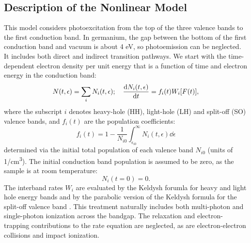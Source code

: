 \subsection{Description of the Nonlinear Model}
\label{sec:nonlinear_excitation_model_details}

This model considers photoexcitation from the top of the three valence bands to the first conduction band. In germanium, the gap between the bottom of the first conduction band and vacuum is about 4 eV, so photoemission can be neglected. It includes both direct and indirect transition pathways. We start with the time-dependent electron density per unit energy that is a function of time and electron energy in the conduction band:
\begin{equation}
N(t, \epsilon) = \sum_{i} N_i(t, \epsilon); \quad \dv{N_i(t, \epsilon)}{t} = f_i(t) W_i [F(t)],
\end{equation}
where the subscript $i$ denotes heavy-hole (HH), light-hole (LH) and split-off (SO) valence bands, and $f_i(t)$ are the population coefficients:
\begin{equation}
f_i(t) = 1 - \frac{1}{N_{i0}} \int_{\epsilon_{i0}}^{\infty} N_i(t,\epsilon) \dd{\epsilon}
\end{equation}
determined via the initial total population of each valence band $N_{i0}$ (units of 1/cm\textsuperscript{3}). The initial conduction band population is assumed to be zero, as the sample is at room temperature:
\begin{equation}
N_i(t=0)=0.
\end{equation}
The interband rates $W_i$ are evaluated by the Keldysh forumla for heavy and light hole energy bands \cite{keldyshIonizationFieldStrong1965} and by the parabolic version of the Keldysh formula for the split-off valence band \cite{gruzdevIonizationNanoparticlesSupershort2014}. This treatment naturally includes both multi-photon and single-photon ionization across the bandgap. The relaxation and electron-trapping contributions to the rate equation are neglected, as are electron-electron collisions and impact ionization.

